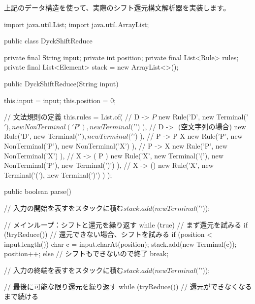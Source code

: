上記のデータ構造を使って、実際のシフト還元構文解析器を実装します。

\begin{codescreen}{}
import java.util.List;
import java.util.ArrayList;

public class DyckShiftReduce {
    private final String input;
    private int position;
    private final List<Rule> rules;
    private final List<Element> stack = new ArrayList<>();

    public DyckShiftReduce(String input) {
        this.input = input;
        this.position = 0;
        
        // 文法規則の定義
        this.rules = List.of(
            // D -> $ P $
            new Rule('D', 
                new Terminal('$'), 
                new NonTerminal('P'), 
                new Terminal('$')
            ),
            // D -> $ $ (空文字列の場合)
            new Rule('D', 
                new Terminal('$'), 
                new Terminal('$')
            ),
            // P -> P X
            new Rule('P', 
                new NonTerminal('P'), 
                new NonTerminal('X')
            ),
            // P -> X
            new Rule('P', 
                new NonTerminal('X')
            ),
            // X -> ( P )
            new Rule('X', 
                new Terminal('('), 
                new NonTerminal('P'), 
                new Terminal(')')
            ),
            // X -> ()
            new Rule('X', 
                new Terminal('('), 
                new Terminal(')')
            )
        );
    }

    public boolean parse() {
        // 入力の開始を表す$をスタックに積む
        stack.add(new Terminal('$'));
        
        // メインループ：シフトと還元を繰り返す
        while (true) {
            // まず還元を試みる
            if (!tryReduce()) {
                // 還元できない場合、シフトを試みる
                if (position < input.length()) {
                    char c = input.charAt(position);
                    stack.add(new Terminal(c));
                    position++;
                } else {
                    // シフトもできないので終了
                    break;
                }
            }
        }
        
        // 入力の終端を表す$をスタックに積む
        stack.add(new Terminal('$'));
        
        // 最後に可能な限り還元を繰り返す
        while (tryReduce()) {
            // 還元ができなくなるまで続ける
        }
        
}}
\end{codescreen}
